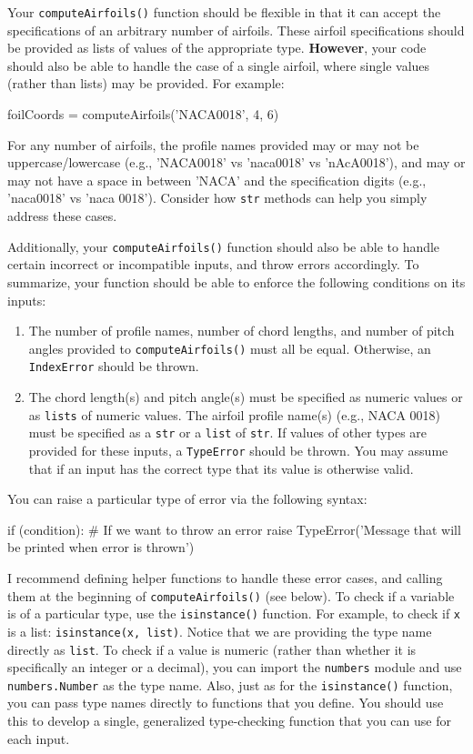 \documentclass{homework}
\begin{document}
Your \texttt{computeAirfoils()} function should be flexible in that it can accept the specifications of an arbitrary number of airfoils. These airfoil specifications should be provided as lists of values of the appropriate type. \textbf{However}, your code should also be able to handle the case of a single airfoil, where single values (rather than lists) may be provided. For example:

\begin{python}
foilCoords = computeAirfoils('NACA0018', 4, 6)
\end{python}

For any number of airfoils, the profile names provided may or may not be uppercase/lowercase (e.g., 'NACA0018' vs 'naca0018' vs 'nAcA0018'), and may or may not have a space in between 'NACA' and the specification digits (e.g., 'naca0018' vs 'naca 0018'). Consider how \texttt{str} methods can help you simply address these cases.

Additionally, your \texttt{computeAirfoils()} function should also be able to handle certain incorrect or incompatible inputs, and throw errors accordingly. To summarize, your function should be able to enforce the following conditions on its inputs:
\begin{enumerate}
    \item The number of profile names, number of chord lengths, and number of pitch angles provided to \texttt{computeAirfoils()} must all be equal. Otherwise, an \texttt{IndexError} should be thrown.
    
    \item The chord length(s) and pitch angle(s) must be specified as numeric values or as \texttt{lists} of numeric values. The airfoil profile name(s) (e.g., NACA 0018) must be specified as a \texttt{str} or a \texttt{list} of \texttt{str}. If values of other types are provided for these inputs, a \texttt{TypeError} should be thrown. You may assume that if an input has the correct type that its value is otherwise valid.
\end{enumerate}

You can raise a particular type of error via the following syntax:

\begin{python}
if (condition): # If we want to throw an error
    raise TypeError('Message that will be printed when error is thrown')
\end{python}

I recommend defining helper functions to handle these error cases, and calling them at the beginning of \texttt{computeAirfoils()} (see below). To check if a variable is of a particular type, use the \texttt{isinstance()} function. For example, to check if \texttt{x} is a list: \texttt{isinstance(x, list)}. Notice that we are providing the type name directly as \texttt{list}. To check if a value is numeric (rather than whether it is specifically an integer or a decimal), you can import the \texttt{numbers} module and use \texttt{numbers.Number} as the type name. Also, just as for the \texttt{isinstance()} function, you can pass type names directly to functions that you define. You should use this to develop a single, generalized type-checking function that you can use for each input.
\end{document}
